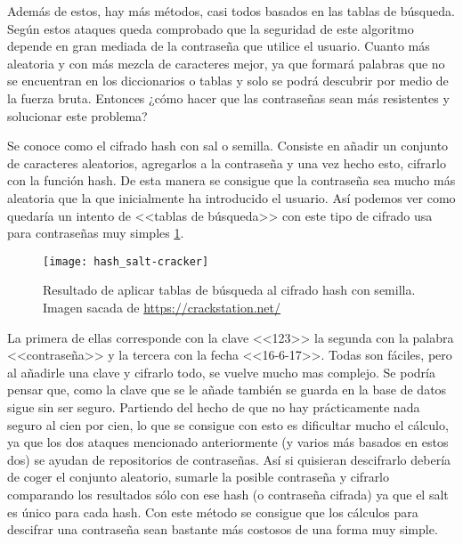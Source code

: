 Además de estos, hay más métodos, casi todos basados en las tablas de búsqueda. Según estos ataques queda comprobado que la seguridad de este algoritmo depende en gran mediada de la contraseña que utilice el usuario. Cuanto más aleatoria y con más mezcla de caracteres mejor, ya que formará palabras que no se encuentran en los diccionarios o tablas y solo se podrá descubrir por medio de la fuerza bruta. Entonces ¿cómo hacer que las contraseñas sean más resistentes y solucionar este problema?

Se conoce como el cifrado hash con sal o semilla. Consiste en añadir un conjunto de caracteres aleatorios, agregarlos a la contraseña y una vez hecho esto, cifrarlo con la función hash. De esta manera se consigue que la contraseña sea mucho más aleatoria que la que inicialmente ha introducido el usuario. Así podemos ver como quedaría un intento de <<tablas de búsqueda>> con este tipo de cifrado usa para contraseñas muy simples \ref{fig:3.3}. 

\begin{figure}[h]
\centering
\texttt{[image: hash\_salt-cracker]}
\caption{Resultado de aplicar tablas de búsqueda al cifrado hash con semilla. Imagen sacada de \url{https://crackstation.net/}}
\label{fig:3.3}
\end{figure}

La primera de ellas corresponde con la clave <<123>> la segunda con la palabra <<contraseña>> y la tercera con la fecha <<16-6-17>>. Todas son fáciles, pero al añadirle una clave y cifrarlo todo, se vuelve mucho mas complejo. Se podría pensar que, como la clave que se le añade también se guarda en la base de datos sigue sin ser seguro. Partiendo del hecho de que no hay prácticamente nada seguro al cien por cien, lo que se consigue con esto es dificultar mucho el cálculo, ya que los dos ataques mencionado anteriormente (y varios más basados en estos dos) se ayudan de repositorios de contraseñas. Así si quisieran descifrarlo debería de coger el conjunto aleatorio, sumarle la posible contraseña y cifrarlo comparando los resultados sólo con ese hash (o contraseña cifrada) ya que el salt es único para cada hash. Con este método se consigue que los cálculos para descifrar una contraseña sean bastante más costosos de una forma muy simple.
